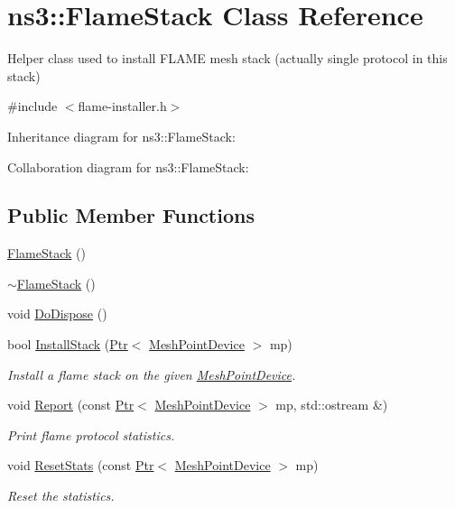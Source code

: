 \hypertarget{classns3_1_1FlameStack}{}\section{ns3\+:\+:Flame\+Stack Class Reference}
\label{classns3_1_1FlameStack}


Helper class used to install F\+L\+A\+ME mesh stack (actually single protocol in this stack)  




{\ttfamily \#include $<$flame-\/installer.\+h$>$}



Inheritance diagram for ns3\+:\+:Flame\+Stack\+:


Collaboration diagram for ns3\+:\+:Flame\+Stack\+:
\subsection*{Public Member Functions}
\begin{DoxyCompactItemize}
\item 
\hyperlink{classns3_1_1FlameStack_af970e774515579794c18372ac4dcddf4}{Flame\+Stack} ()
\item 
\hyperlink{classns3_1_1FlameStack_a29158c47972759c66b9cfd2bf9c3f2ce}{$\sim$\+Flame\+Stack} ()
\item 
void \hyperlink{classns3_1_1FlameStack_a2a2143ead8e8b137e009a42ca2151c58}{Do\+Dispose} ()
\item 
bool \hyperlink{classns3_1_1FlameStack_a770bd4e8b96c42aec0a7a41ba1a667ef}{Install\+Stack} (\hyperlink{classns3_1_1Ptr}{Ptr}$<$ \hyperlink{classns3_1_1MeshPointDevice}{Mesh\+Point\+Device} $>$ mp)
\begin{DoxyCompactList}\small\item\em Install a flame stack on the given \hyperlink{classns3_1_1MeshPointDevice}{Mesh\+Point\+Device}. \end{DoxyCompactList}\item 
void \hyperlink{classns3_1_1FlameStack_a6f7ad90d875c88d10437670b28d9f8e0}{Report} (const \hyperlink{classns3_1_1Ptr}{Ptr}$<$ \hyperlink{classns3_1_1MeshPointDevice}{Mesh\+Point\+Device} $>$ mp, std\+::ostream \&)
\begin{DoxyCompactList}\small\item\em Print flame protocol statistics. \end{DoxyCompactList}\item 
void \hyperlink{classns3_1_1FlameStack_a101c1ea5691abd5942270441df461a2d}{Reset\+Stats} (const \hyperlink{classns3_1_1Ptr}{Ptr}$<$ \hyperlink{classns3_1_1MeshPointDevice}{Mesh\+Point\+Device} $>$ mp)
\begin{DoxyCompactList}\small\item\em Reset the statistics. \end{DoxyCompactList}\end{DoxyCompactItemize}

